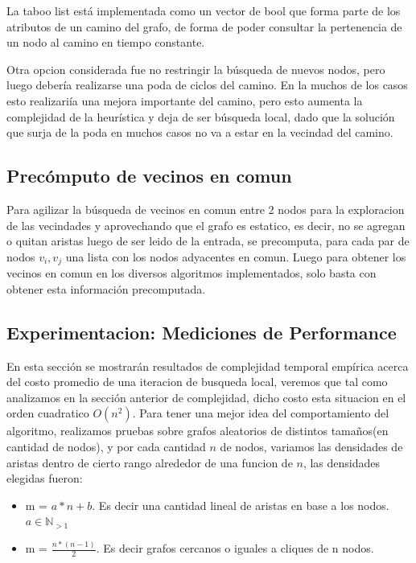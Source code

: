 \vspace{2mm}

La taboo list est\'a implementada como un vector de bool que forma parte de los atributos de un camino del grafo, de forma de poder consultar la pertenencia de un nodo al camino en tiempo constante.

\vspace{2mm}

	Otra opcion considerada fue no restringir la b\'usqueda de nuevos nodos, pero luego deber\'ia realizarse una poda de ciclos del camino. En la muchos de los casos esto realizari\'ia una mejora importante del camino, pero esto aumenta la complejidad de la heur\'istica y deja de ser b\'usqueda local, dado que la soluci\'on que surja de la poda en muchos casos no va a estar en la vecindad del camino.
 
\subsection{Prec\'omputo de vecinos en comun}
Para agilizar la b\'usqueda de vecinos en comun entre 2 nodos para la exploracion de las vecindades y aprovechando que el grafo es estatico, es decir, no se agregan o quitan aristas luego de ser leido de la entrada, se precomputa, para cada par de nodos $v_i,v_j$ una lista con los nodos adyacentes en comun. Luego para obtener los vecinos en comun en los diversos algoritmos implementados, solo basta con obtener esta informaci\'on precomputada.

\subsection{Experimentacion: Mediciones de Performance}
En esta secci\'on se mostrar\'an resultados de complejidad temporal emp\'irica acerca del costo promedio de una iteracion de busqueda local, veremos que tal como analizamos en la secci\'on anterior de complejidad, dicho costo esta situacion en el orden cuadratico $O(n^2)$.
Para tener una mejor idea del comportamiento del algoritmo, realizamos pruebas sobre grafos aleatorios de distintos tama\~nos(en cantidad de nodos), y por cada cantidad $n$ de nodos, variamos las densidades de aristas dentro de cierto rango alrededor de una funcion de $n$, las densidades elegidas fueron:
\begin{itemize}
	\item m = $a*n + b$. Es decir una cantidad lineal de aristas en base a los nodos. $a \in \mathbb{N}_{>1}$
	\item m = $\frac{n*(n-1)}{2}$. Es decir grafos cercanos o iguales a cliques de n nodos.
\end{itemize}


